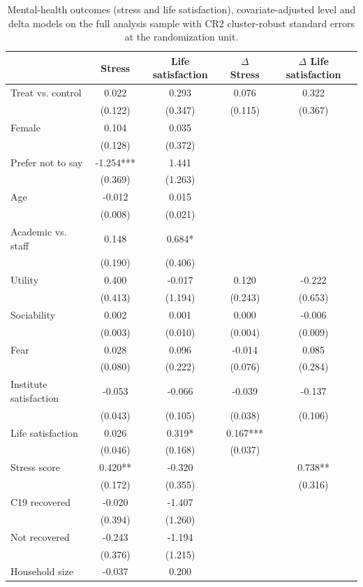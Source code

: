 \begin{table}
\centering
\caption{Mental-health outcomes (stress and life satisfaction), covariate-adjusted level and delta models on the full analysis sample with CR2 cluster-robust standard errors at the randomization unit.\label{tab:lm-mentalhealth-cov-effective}}
\centering
\begin{tabular}[t]{lcccc}
\toprule
  & Stress & Life satisfaction & $\Delta$ Stress & $\Delta$ Life satisfaction\\
\midrule
Treat vs. control & 0.022 & 0.293 & 0.076 & 0.322\\
 & (0.122) & (0.347) & (0.115) & (0.367)\\
Female & 0.104 & 0.035 &  & \\
 & (0.128) & (0.372) &  & \\
Prefer not to say & -1.254*** & 1.441 &  & \\
 & (0.369) & (1.263) &  & \\
Age & -0.012 & 0.015 &  & \\
 & (0.008) & (0.021) &  & \\
Academic vs. staff & 0.148 & 0.684* &  & \\
 & (0.190) & (0.406) &  & \\
Utility & 0.400 & -0.017 & 0.120 & -0.222\\
 & (0.413) & (1.194) & (0.243) & (0.653)\\
Sociability & 0.002 & 0.001 & 0.000 & -0.006\\
 & (0.003) & (0.010) & (0.004) & (0.009)\\
Fear & 0.028 & 0.096 & -0.014 & 0.085\\
 & (0.080) & (0.222) & (0.076) & (0.284)\\
Institute satisfaction & -0.053 & -0.066 & -0.039 & -0.137\\
 & (0.043) & (0.105) & (0.038) & (0.106)\\
Life satisfaction & 0.026 & 0.319* & 0.167*** & \\
 & (0.046) & (0.168) & (0.037) & \\
Stress score & 0.420** & -0.320 &  & 0.738**\\
 & (0.172) & (0.355) &  & (0.316)\\
C19 recovered & -0.020 & -1.407 &  & \\
 & (0.394) & (1.260) &  & \\
Not recovered & -0.243 & -1.194 &  & \\
 & (0.376) & (1.215) &  & \\
Household size & -0.037 & 0.200 &  & \\

\end{tabular}
\end{table}
